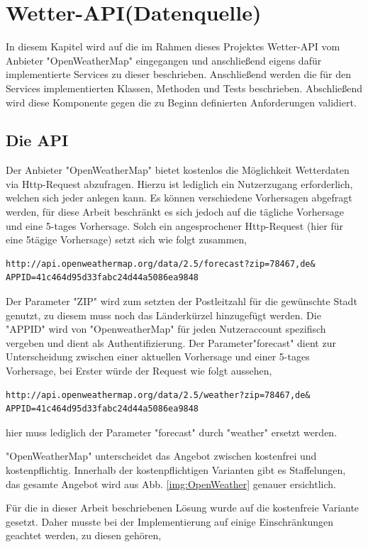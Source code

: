 \section{Wetter-API(Datenquelle)}
In diesem Kapitel wird auf die im Rahmen dieses Projektes Wetter-API vom Anbieter "OpenWeatherMap" eingegangen und anschließend eigens dafür implementierte Services zu dieser beschrieben. Anschließend werden die für den Services implementierten Klassen, Methoden und Tests beschrieben. Abschließend wird diese Komponente gegen die zu Beginn definierten Anforderungen validiert. 
\subsection{Die API}
Der Anbieter "OpenWeatherMap" bietet kostenlos die Möglichkeit Wetterdaten via Http-Request abzufragen. 
Hierzu ist lediglich ein Nutzerzugang erforderlich, welchen sich jeder anlegen kann. Es können verschiedene Vorhersagen abgefragt werden, für diese Arbeit beschränkt es sich jedoch auf die tägliche Vorhersage und eine  5-tages Vorhersage. Solch ein angesprochener Http-Request (hier für eine 5tägige Vorhersage) setzt sich wie folgt zusammen, 
\begin{lstlisting}
http://api.openweathermap.org/data/2.5/forecast?zip=78467,de&
APPID=41c464d95d33fabc24d44a5086ea9848
\end{lstlisting}

Der Parameter "ZIP" wird zum setzten der Postleitzahl für die gewünschte Stadt genutzt, zu diesem muss noch das Länderkürzel hinzugefügt werden. Die "APPID" wird von "OpenweatherMap" für jeden Nutzeraccount spezifisch vergeben und dient als Authentifizierung. Der Parameter"forecast" dient zur Unterscheidung zwischen einer aktuellen Vorhersage und einer 5-tages Vorhersage, bei Erster würde der Request wie folgt aussehen, 

\begin{lstlisting}
http://api.openweathermap.org/data/2.5/weather?zip=78467,de&
APPID=41c464d95d33fabc24d44a5086ea9848
\end{lstlisting}

hier muss lediglich der Parameter "forecast" durch "weather" ersetzt werden. 

"OpenWeatherMap" unterscheidet das Angebot zwischen kostenfrei und kostenpflichtig. Innerhalb der kostenpflichtigen Varianten gibt es Staffelungen, das gesamte Angebot wird aus Abb. \ref{img:OpenWeather} genauer ersichtlich. 

Für die in dieser Arbeit beschriebenen Lösung wurde auf die kostenfreie Variante gesetzt. Daher musste bei der Implementierung auf einige Einschränkungen geachtet werden, zu diesen gehören, 

